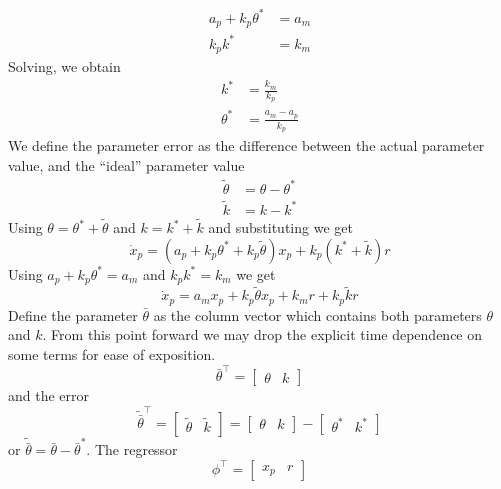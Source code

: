 \begin{example}
\begin{align*}
    a_{p}+k_{p}\theta^{*}&=a_{m} \\
    k_{p}k^{*}&=k_{m}
  \end{align*}
  Solving, we obtain
  \begin{align*}
    k^{*}&=\frac{k_{m}}{k_{p}} \\
    \theta^{*}&=\frac{a_{m}-a_{p}}{k_{p}}
  \end{align*}
  We define the parameter error as the difference between the actual parameter value, and the ``ideal'' parameter value
  \begin{align*}
    \tilde{\theta}&=\theta-\theta^{*} \\
    \tilde{k}&=k-k^{*}
  \end{align*}
  Using $\theta=\theta^{*}+\tilde{\theta}$ and $k=k^{*}+\tilde{k}$ and substituting we get
  \begin{equation*}
    \dot{x}_{p}=(a_{p}+k_{p}\theta^{*}+k_{p}\tilde{\theta})x_{p}+k_{p}(k^{*}+\tilde{k})r
  \end{equation*}
  Using $a_{p}+k_{p}\theta^{*}=a_{m}$ and $k_{p}k^{*}=k_{m}$ we get
  \begin{equation*}
    \dot{x}_{p}=a_{m}x_{p}+k_{p}\tilde{\theta}x_{p}+k_{m}r+k_{p}\tilde{k}r
  \end{equation*}
  Define the parameter $\bar{\theta}$ as the column vector which contains both parameters $\theta$ and $k$.
  From this point forward we may drop the explicit time dependence on some terms for ease of exposition.
  \begin{equation*}
    \bar{\theta}^{\top}=
    \begin{bmatrix}
      \theta & k
    \end{bmatrix}
  \end{equation*}
  and the error
  \begin{equation*}
    \tilde{\bar{\theta}}^{\top}=
    \begin{bmatrix}
      \tilde{\theta} & \tilde{k}
    \end{bmatrix}=
    \begin{bmatrix}
      \theta & k
    \end{bmatrix}-
    \begin{bmatrix}
      \theta^{*} & k^{*}
    \end{bmatrix}
  \end{equation*}
  or $\tilde{\bar{\theta}}=\bar{\theta}-\bar{\theta}^{*}$.
  The regressor
  \begin{equation*}
    \phi^{\top}=
    \begin{bmatrix}
      x_{p} & r

\end{bmatrix}
\end{equation*}
\end{example}
